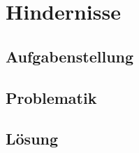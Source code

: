 \section{Hindernisse}

\subsection{Aufgabenstellung}
\lipsum[2]

\subsection{Problematik}
\lipsum[3]

\subsection{Lösung}
\lipsum[4-5]
